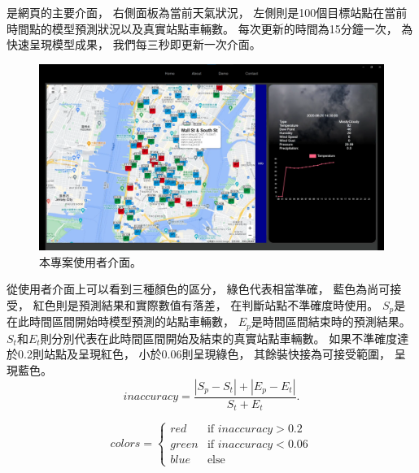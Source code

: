 \documentclass[a4paper,12pt]{extarticle}
\begin{document}
            是網頁的主要介面，
            右側面板為當前天氣狀況，
            左側則是100個目標站點在當前時間點的模型預測狀況以及真實站點車輛數。
            每次更新的時間為15分鐘一次，
            為快速呈現模型成果，
            我們每三秒即更新一次介面。
            \begin{figure}[htb]
                \centering
                \includegraphics[width=\textwidth]{nstc_adjust_image.png}
                \caption{
                    本專案使用者介面。
                }
                \label{fig:web-view}
            \end{figure}
            從使用者介面上可以看到三種顏色的區分，
            綠色代表相當準確，
            藍色為尚可接受，
            紅色則是預測結果和實際數值有落差，
            在判斷站點不準確度時使用。
            $S_p$是在此時間區間開始時模型預測的站點車輛數，
            $E_p$是時間區間結束時的預測結果。
            $S_t$和$E_t$則分別代表在此時間區間開始及結束的真實站點車輛數。
            如果不準確度達於0.2則站點及呈現紅色，
            小於0.06則呈現綠色，
            其餘裝快接為可接受範圍，
            呈現藍色。
            \begin{equation}
                \label{acc_equ}
                \text{$inaccuracy$} = \frac{|S_p-S_t|+|E_p-E_t|}{S_t+E_t}.
            \end{equation}

            \[
            colors =
            \begin{cases}
                red & \text{if $inaccuracy>0.2$} \\
                green & \text{if $inaccuracy<0.06$} \\
                blue & \text{else} 
            \end{cases}
            \]
\end{document}
